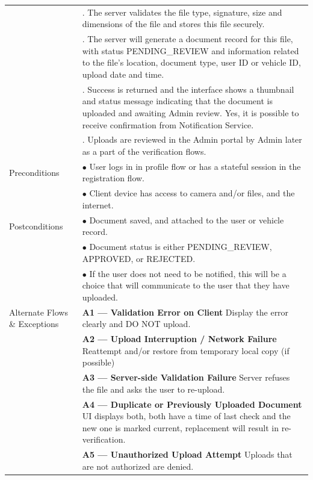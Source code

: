 \begin{longtable}{|>{\raggedright\arraybackslash}p{4cm}|>{\raggedright\arraybackslash}p{11cm}|}
& 6. The server validates the file type, signature, size and dimensions of the file and stores this file securely. \\
& 7. The server will generate a document record for this file, with status PENDING_REVIEW and information related to the file's location, document type, user ID or vehicle ID, upload date and time. \\
& 8. Success is returned and the interface shows a thumbnail and status message indicating that the document is uploaded and awaiting Admin review. Yes, it is possible to receive confirmation from Notification Service. \\
& 9. Uploads are reviewed in the Admin portal by Admin later as a part of the verification flows. \\
\hline
Preconditions & $\bullet$ User logs in in profile flow or has a stateful session in the registration flow. \\
& $\bullet$ Client device has access to camera and/or files, and the internet. \\
\hline
Postconditions & $\bullet$ Document saved, and attached to the user or vehicle record. \\
& $\bullet$ Document status is either PENDING_REVIEW, APPROVED, or REJECTED. \\
& $\bullet$ If the user does not need to be notified, this will be a choice that will communicate to the user that they have uploaded. \\
\hline
Alternate Flows \& Exceptions & \textbf{A1 — Validation Error on Client} \newline Display the error clearly and DO NOT upload. \\
& \textbf{A2 — Upload Interruption / Network Failure} \newline Reattempt and/or restore from temporary local copy (if possible) \\
& \textbf{A3 — Server-side Validation Failure} \newline Server refuses the file and asks the user to re-upload. \\
& \textbf{A4 — Duplicate or Previously Uploaded Document} \newline UI displays both, both have a time of last check and the new one is marked current, replacement will result in re-verification. \\
& \textbf{A5 — Unauthorized Upload Attempt} \newline Uploads that are not authorized are denied. \\
\hline

\end{longtable}

